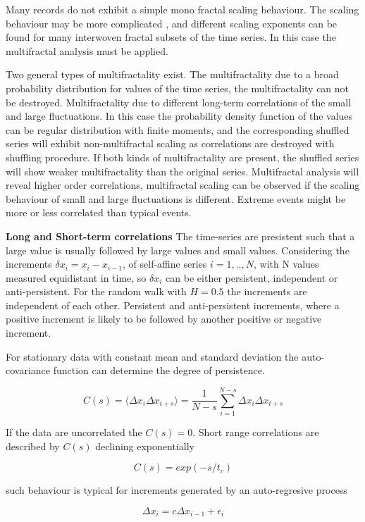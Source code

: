 Many records do not exhibit a simple mono fractal scaling behaviour. The scaling behaviour may be more complicated , and different scaling exponents can be found for many interwoven fractal subsets of the time series. In this case the multifractal analysis must be applied. 

Two general types of multifractality exist. The multifractality due to a broad probability distribution for values of the time series, the multifractality can not be destroyed. Multifractality due to different long-term correlations of the small and large fluctuations. In this case the probability density function of the values can be regular distribution with finite moments, and the corresponding shuffled series will exhibit non-multifractal scaling as correlations are destroyed with shuffling procedure. If both kinds of multifractality are present, the shuffled series will show weaker multifractality than the original series. Multifractal analysis will reveal higher order correlations, multifractal scaling can be observed if the scaling behaviour of small and large fluctuations is different. Extreme events might be more or less correlated than typical events.  

\textbf{Long and Short-term correlations}
The time-series are presistent such that a large value is usually followed by large values and small values. Considering the increments $\delta x_i = x_i - x_{i-1}$, of self-affine series $i = 1,..,N$, with N values measured equidistant in time, so $\delta x_i$ can be either persistent, independent or anti-persistent. For the random walk with $H=0.5$ the increments are independent of each other. Persistent and anti-persistent increments, where a positive increment is likely to be followed by another positive or negative increment. 

For stationary data with constant mean and standard deviation the auto-covariance function can determine the degree of persistence. 

$$C(s) = \langle \Delta x_i \Delta x_{i+s} \rangle = \frac{1}{N-s} \sum_{i=1}^{N-s}\Delta x_i \Delta x_{i+s} $$ 

If the data are uncorrelated the $C(s)=0$. Short range correlations are described by $C(s)$ declining exponentially

$$C(s) = exp(-s/t_c)$$

such behaviour is typical for increments generated by an auto-regresive process 

$$ \Delta x_i = c\Delta x_{i-1} + \epsilon_i $$

